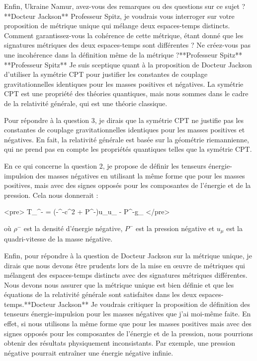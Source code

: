 Enfin, Ukraine Namur, avez-vous des remarques ou des questions sur ce sujet ?
**Docteur Jackson**
Professeur Spitz, je voudrais vous interroger sur votre proposition de métrique unique qui mélange deux espaces-temps distincts. Comment garantissez-vous la cohérence de cette métrique, étant donné que les signatures métriques des deux espaces-temps sont différentes ? Ne créez-vous pas une incohérence dans la définition même de la métrique ?**Professeur Spitz**
**Professeur Spitz**
Je suis sceptique quant à la proposition de Docteur Jackson d'utiliser la symétrie CPT pour justifier les constantes de couplage gravitationnelles identiques pour les masses positives et négatives. La symétrie CPT est une propriété des théories quantiques, mais nous sommes dans le cadre de la relativité générale, qui est une théorie classique.

Pour répondre à la question 3, je dirais que la symétrie CPT ne justifie pas les constantes de couplage gravitationnelles identiques pour les masses positives et négatives. En fait, la relativité générale est basée sur la géométrie riemannienne, qui ne prend pas en compte les propriétés quantiques telles que la symétrie CPT.

En ce qui concerne la question 2, je propose de définir les tenseurs énergie-impulsion des masses négatives en utilisant la même forme que pour les masses positives, mais avec des signes opposés pour les composantes de l'énergie et de la pression. Cela nous donnerait :

<pre>
T_{\mu\nu}^{-} = (-\rho^{-}c^2 + P^{-})u_{\mu}u_{\nu} - P^{-}g_{\mu\nu}
</pre>

où $\rho^{-}$ est la densité d'énergie négative, $P^{-}$ est la pression négative et $u_{\mu}$ est la quadri-vitesse de la masse négative.

Enfin, pour répondre à la question de Docteur Jackson sur la métrique unique, je dirais que nous devons être prudents lors de la mise en œuvre de métriques qui mélangent des espaces-temps distincts avec des signatures métriques différentes. Nous devons nous assurer que la métrique unique est bien définie et que les équations de la relativité générale sont satisfaites dans les deux espaces-temps.**Docteur Jackson**
Je voudrais critiquer la proposition de définition des tenseurs énergie-impulsion pour les masses négatives que j'ai moi-même faite. En effet, si nous utilisons la même forme que pour les masses positives mais avec des signes opposés pour les composantes de l'énergie et de la pression, nous pourrions obtenir des résultats physiquement inconsistants. Par exemple, une pression négative pourrait entraîner une énergie négative infinie.

